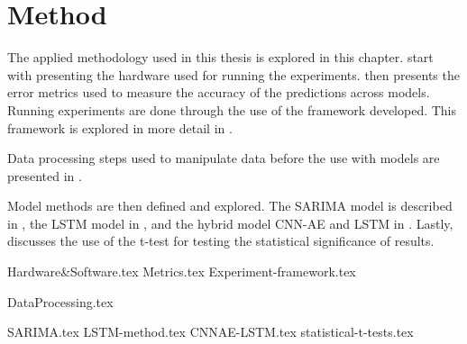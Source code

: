 \chapter{Method}
\label{section:Method}

The applied methodology used in this thesis is explored in this chapter.
 start with presenting the hardware used for running the experiments.
 then presents the error metrics used to measure the accuracy of the predictions across models.
Running experiments are done through the use of the framework developed. This framework is explored in more detail in .

Data processing steps used to manipulate data before the use with models are presented in .

Model methods are then defined and explored. The SARIMA model is described in , the LSTM model in ,
and the hybrid model CNN-AE and LSTM in .
Lastly,  discusses the use of the t-test for testing the statistical significance of results.


{Hardware&Software.tex}
{Metrics.tex}
{Experiment-framework.tex}

{DataProcessing.tex}

{SARIMA.tex}
{LSTM-method.tex}
{CNNAE-LSTM.tex}
{statistical-t-tests.tex}
